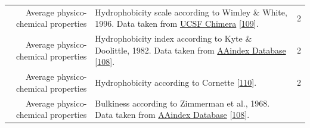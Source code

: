 \documentclass[12pt,a4paper,twoside]{book}
\theoremstyle{definition}
\theoremstyle{definition}
\theoremstyle{remark}
\begin{document}
\begin{longtable}[]{@{}rlc@{}}
\begin{minipage}[t]{0.23\columnwidth}\raggedleft\strut
Average physico-chemical properties\strut
\end{minipage} & \begin{minipage}[t]{0.50\columnwidth}\raggedright\strut
Hydrophobicity scale according to Wimley \& White, 1996. Data taken from
\href{https://www.cgl.ucsf.edu/chimera/docs/ContributedSoftware/defineattrib/wwHydrophobicity.txt}{UCSF
Chimera} {[}\protect\hyperlink{ref-Wimley1996}{109}{]}.\strut
\end{minipage} & \begin{minipage}[t]{0.18\columnwidth}\centering\strut
2\strut
\end{minipage}\tabularnewline
\begin{minipage}[t]{0.23\columnwidth}\raggedleft\strut
Average physico-chemical properties\strut
\end{minipage} & \begin{minipage}[t]{0.50\columnwidth}\raggedright\strut
Hydrophobicity index according to Kyte \& Doolittle, 1982. Data taken
from
\href{http://www.genome.jp/dbget-bin/www_bget?aaindex:KYTJ820101}{AAindex
Database} {[}\protect\hyperlink{ref-Kawashima2008}{108}{]}.\strut
\end{minipage} & \begin{minipage}[t]{0.18\columnwidth}\centering\strut
2\strut
\end{minipage}\tabularnewline
\begin{minipage}[t]{0.23\columnwidth}\raggedleft\strut
Average physico-chemical properties\strut
\end{minipage} & \begin{minipage}[t]{0.50\columnwidth}\raggedright\strut
Hydrophobicity according to Cornette
{[}\protect\hyperlink{ref-Cornette1987}{110}{]}.\strut
\end{minipage} & \begin{minipage}[t]{0.18\columnwidth}\centering\strut
2\strut
\end{minipage}\tabularnewline
\begin{minipage}[t]{0.23\columnwidth}\raggedleft\strut
Average physico-chemical properties\strut
\end{minipage} & \begin{minipage}[t]{0.50\columnwidth}\raggedright\strut
Bulkiness according to Zimmerman et al., 1968. Data taken from
\href{http://www.genome.jp/dbget-bin/www_bget?aaindex:ZIMJ680102}{AAindex
Database} {[}\protect\hyperlink{ref-Kawashima2008}{108}{]}.\strut
\end{minipage} & \begin{minipage}[t]{0.18\columnwidth}\centering\strut

\end{minipage}
\end{longtable}
\end{document}
